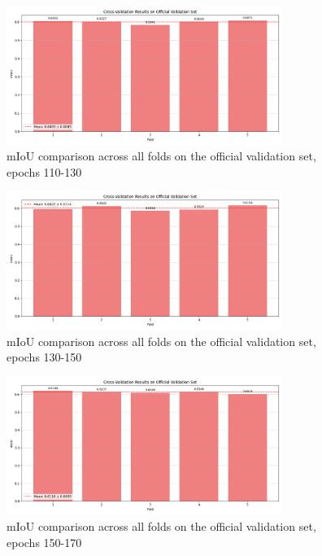 \documentclass[]{article}
\begin{document}
\begin{figure}[htbp]
		\centering
		\includegraphics[width=0.8\textwidth]{figures/folds_110_130.png}
		\caption{mIoU comparison across all folds on the official validation set, epochs 110-130}
		\label{fig:cross_val_110_130_val}
\end{figure}

\begin{figure}[htbp]
		\centering
		\includegraphics[width=0.8\textwidth]{figures/folds_130_150.png}
		\caption{mIoU comparison across all folds on the official validation set, epochs 130-150}
		\label{fig:cross_val_130_150_val}
\end{figure}

\begin{figure}[htbp]
		\centering
		\includegraphics[width=0.8\textwidth]{figures/folds_150_170.png}
		\caption{mIoU comparison across all folds on the official validation set, epochs 150-170}
		\label{fig:cross_val_150_170_val}
\end{figure}
\end{document}
